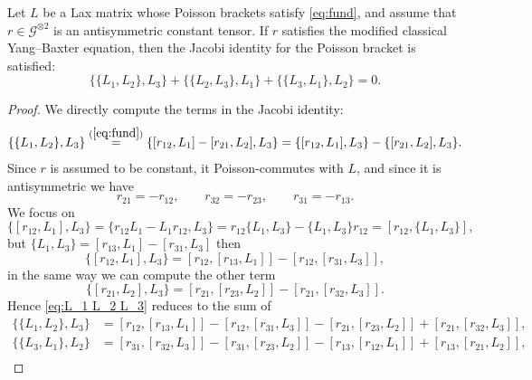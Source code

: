 \begin{proposition}
    Let $L$ be a Lax matrix whose Poisson brackets satisfy \eqref{eq:fund}, and assume that $r \in \mathcal{G}^{\otimes 2}$ is an antisymmetric constant tensor. If $r$ satisfies the modified classical Yang--Baxter equation, then the Jacobi identity for the Poisson bracket is satisfied:
    \begin{equation}
        \{\{L_1,L_2\},L_3\}
        + \{\{L_2,L_3\},L_1\}
        + \{\{L_3,L_1\},L_2\}
        = 0.
    \end{equation}
\end{proposition}
\begin{proof}
    We directly compute the terms in the Jacobi identity:
    \begin{equation} \label{eq:L_1 L_2 L_3}
        \{ \{L_1 , L_2 \} , L_3 \} \overset{(\ref{eq:fund})}{=} \{ [r_{12}, L_1] - [r_{21}, L_2] , L_3 \} = \{ [r_{12}, L_1] , L_3 \} - \{ [r_{21}, L_2] , L_3 \}.
    \end{equation}
    Since $r$ is assumed to be constant, it Poisson-commutes with $L$, and since it is antisymmetric we have
    \begin{equation}
        r_{21} = -r_{12}, \qquad r_{32} = -r_{23}, \qquad r_{31} = -r_{13}.
    \end{equation}
    We focus on 
    \begin{equation}
        \{ [r_{12}, L_1] , L_3 \} = \{ r_{12} L_1 - L_1 r_{12}, L_3 \} = r_{12} \{ L_1, L_3 \} - \{ L_1, L_3 \} r_{12} = [r_{12}, \{ L_1, L_3 \}],
    \end{equation}
    but $\{ L_1, L_3 \} = [r_{13}, L_1 ] - [r_{31}, L_3 ]$ then 
    \begin{equation}
        \{ [r_{12}, L_1] , L_3 \} = [r_{12}, [r_{13}, L_1]] - [r_{12}, [r_{31}, L_3]],
    \end{equation}
    in the same way we can compute the other term
    \begin{equation}
        \{ [r_{21}, L_2] , L_3 \} = [r_{21}, [r_{23}, L_2]] - [r_{21}, [r_{32}, L_3]].
    \end{equation}
    Hence \eqref{eq:L_1 L_2 L_3} reduces to the sum of 
    \begin{align} 
        \{ \{L_1, L_2 \}, L_3 \} &= [r_{12}, [r_{13}, L_1]] - [r_{12}, [r_{31}, L_3]] - [r_{21}, [r_{23}, L_2]] + [r_{21}, [r_{32}, L_3]] \label{eq:L_123},\\
        \{ \{L_3, L_1 \}, L_2 \} &= [r_{31}, [r_{32}, L_3]] - [r_{31}, [r_{23}, L_2]] - [r_{13}, [r_{12}, L_1]] + [r_{13}, [r_{21}, L_2]] \label{eq:L_321},\\

\end{align}
\end{proof}
